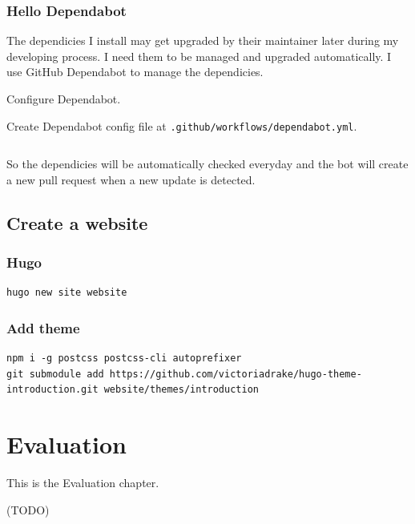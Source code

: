 \documentclass[a4paper]{report}
\begin{document}
\subsection{Hello Dependabot}

The dependicies I install may get upgraded by their maintainer later during my developing process. I need them to be managed and upgraded automatically. I use GitHub Dependabot to manage the dependicies.

Configure Dependabot.

Create Dependabot config file at \texttt{.github/workflows/dependabot.yml}.

\inputminted{yaml}{../.github/dependabot.yml}

So the dependicies will be automatically checked everyday and the bot will create a new pull request when a new update is detected.

\section{Create a website}

\subsection{Hugo}
\begin{verbatim}
hugo new site website
\end{verbatim}

\subsection{Add theme}
\begin{verbatim}
npm i -g postcss postcss-cli autoprefixer
git submodule add https://github.com/victoriadrake/hugo-theme-introduction.git website/themes/introduction
\end{verbatim}

\chapter{Evaluation}

This is the Evaluation chapter.

(TODO)
\end{document}
